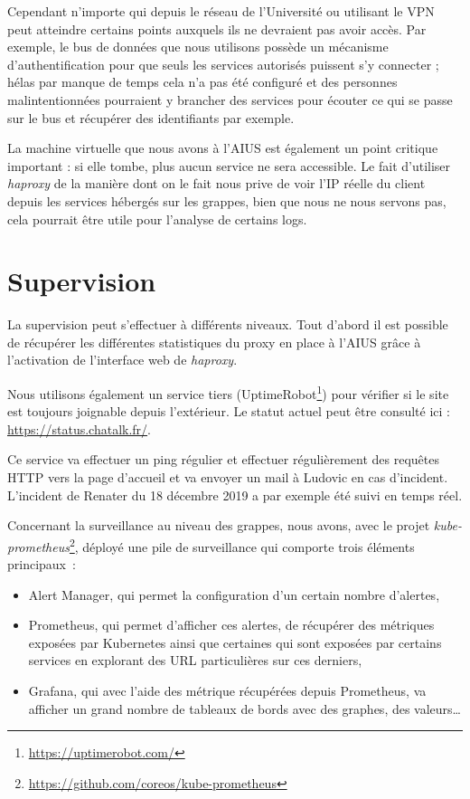 Cependant n'importe qui depuis le réseau de l'Université ou utilisant le
VPN peut atteindre certains points auxquels ils ne devraient pas avoir
accès. Par exemple, le bus de données que nous utilisons possède un
mécanisme d'authentification pour que seuls les services autorisés
puissent s'y connecter ; hélas par manque de temps cela n'a pas été
configuré et des personnes malintentionnées pourraient y brancher des
services pour écouter ce qui se passe sur le bus et récupérer des
identifiants par exemple.

La machine virtuelle que nous avons à l'AIUS est également un point
critique important : si elle tombe, plus aucun service ne sera
accessible. Le fait d'utiliser \textit{haproxy} de la manière dont on le
fait nous prive de voir l'IP réelle du client depuis les services
hébergés sur les grappes, bien que nous ne nous servons pas, cela
pourrait être utile pour l'analyse de certains logs.

\section{Supervision}

La supervision peut s'effectuer à différents niveaux. Tout d'abord il
est possible de récupérer les différentes statistiques du proxy en place
à l'AIUS grâce à l'activation de l'interface web de \textit{haproxy}.

Nous utilisons également un service tiers
(UptimeRobot\footnote{\url{https://uptimerobot.com/}})
pour vérifier si le site est toujours joignable depuis l'extérieur. Le
statut actuel peut être consulté ici : \url{https://status.chatalk.fr/}.

Ce service va effectuer un ping régulier et effectuer régulièrement des
requêtes HTTP vers la page d'accueil et va envoyer un mail à Ludovic en
cas d'incident. L'incident de Renater du 18 décembre 2019 a par exemple
été suivi en temps réel.

Concernant la surveillance au niveau des grappes, nous avons, avec le
projet
\textit{kube-prometheus}\footnote{
  \url{https://github.com/coreos/kube-prometheus}},
déployé une pile de surveillance qui comporte trois éléments
principaux\ :

\begin{itemize}
\item
  Alert Manager, qui permet la configuration d'un certain nombre
  d'alertes,
\item
  Prometheus, qui permet d'afficher ces alertes, de récupérer des
  métriques exposées par Kubernetes ainsi que certaines qui sont
  exposées par certains services en explorant des URL particulières sur
  ces derniers,
\item
  Grafana, qui avec l'aide des métrique récupérées depuis Prometheus, va
  afficher un grand nombre de tableaux de bords avec des graphes, des
  valeurs\ldots{}
\end{itemize}

